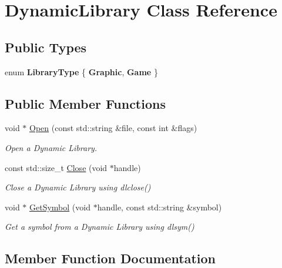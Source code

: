 \hypertarget{class_dynamic_library}{}\section{Dynamic\+Library Class Reference}
\label{class_dynamic_library}
\subsection*{Public Types}
\begin{DoxyCompactItemize}
\item 
\mbox{\label{class_dynamic_library_afb8f6e78a2a72fb58501f4d1fb38ad3f}} 
enum {\bfseries Library\+Type} \{ {\bfseries Graphic}, 
{\bfseries Game}
 \}
\end{DoxyCompactItemize}
\subsection*{Public Member Functions}
\begin{DoxyCompactItemize}
\item 
void $\ast$ \hyperlink{class_dynamic_library_afa5c94973f70976c400dd3caeafc6022}{Open} (const std\+::string \&file, const int \&flags)
\begin{DoxyCompactList}\small\item\em Open a Dynamic Library. \end{DoxyCompactList}\item 
const std\+::size\+\_\+t \hyperlink{class_dynamic_library_adb3b9207f5fcd9f00694af48a7e45cc9}{Close} (void $\ast$handle)
\begin{DoxyCompactList}\small\item\em Close a Dynamic Library using {\ttfamily dlclose()} \end{DoxyCompactList}\item 
void $\ast$ \hyperlink{class_dynamic_library_a7be5e4717bd16b25d6ddfde33941409c}{Get\+Symbol} (void $\ast$handle, const std\+::string \&symbol)
\begin{DoxyCompactList}\small\item\em Get a symbol from a Dynamic Library using {\ttfamily dlsym()} \end{DoxyCompactList}\end{DoxyCompactItemize}


\subsection{Member Function Documentation}
\mbox{\label{class_dynamic_library_adb3b9207f5fcd9f00694af48a7e45cc9}} 
